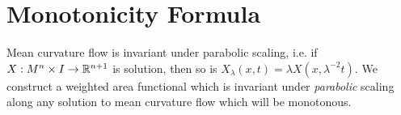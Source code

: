 \section{Monotonicity Formula}
\begin{comment}
    Let $ X: M^{n} \times I \to \R^{n+1} $ be a one-parameter family of immersions flowing by mean curvature. Let $ \{x^{i}\} $ be local coordinates around a point $ p \in M $. Then the metric and second fundamental form is given by 
\[ g_{ij} = \left< \frac{\dou X}{\dou x^{i}}, \frac{\dou X}{\dou x^{j}} \right> , \qquad h_{ij} = \left<\eta, \frac{\partial^{2}X}{\dou x^{i}\dou x^{j}} \right>. \]

If we scale the solution by a factor of $ \lambda  $, defined by $ \tilde{X}(x,t) = \lambda X(x,t) $ we get the following metric and second fundamental form 

\[ \tilde{g_{ij}} = \left< \frac{\dou \tilde{X}}{\dou x^{i}}, \frac{\dou \tilde{X}}{\dou x^{j}} \right>  = \lambda^{2}g_{ij} ,\qquad \tilde{h_{ij}} = \left<\eta, \frac{\partial^{2}\tilde{X}}{\dou x^{i}\dou x^{j}} \right>  = \lambda h_{ij}\]
so the scaled mean curvature is given by $ \tilde{H} = \tilde{g}^{{ij}}\tilde{h}_{ij} = \frac{1}{\lambda}H $. This implies the scaled solutions satisfy the evolution equation

\[ \frac{\dou \tilde{X}}{\dou t} = \lambda \frac{\dou X}{\dou t} = -\lambda^{2}\tilde{H}\eta \]
or
\[ \frac{\dou \tilde{X}}{\dou (\lambda^{2}t)} = - \tilde{H}\eta \]
Hence if scale time by $ \lambda^{2} $, then $ \tilde{X} $ is also a solution of the mean curvature flow.
\end{comment}

Mean curvature flow is invariant under parabolic scaling, i.e.  if $ X : M^{n} \times I \to \mathbb{R}^{n+1} $ is solution, then so is $ X_{\lambda}(x,t) = \lambda X(x,\lambda^{-2}t) $. We construct a weighted area functional which is invariant under \textit{parabolic} scaling along any solution to mean curvature flow which will be monotonous.

